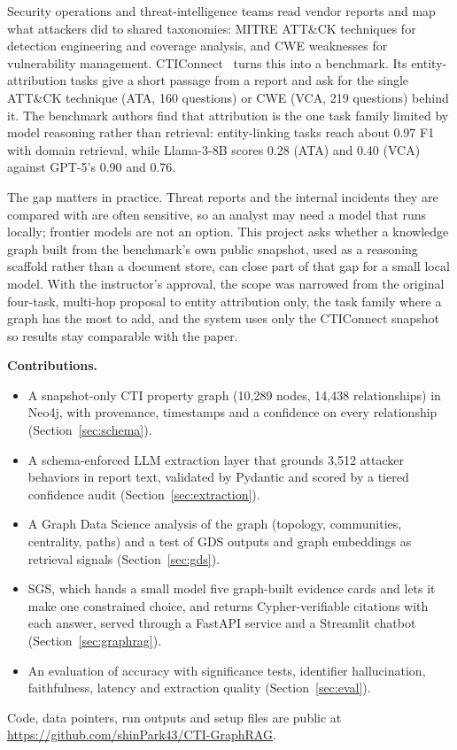 \documentclass[conference]{IEEEtran}
\begin{document}
Security operations and threat-intelligence teams read vendor reports and map what attackers did to shared taxonomies: MITRE ATT\&CK techniques for detection engineering and coverage analysis, and CWE weaknesses for vulnerability management. CTIConnect~\cite{cticonnect} turns this into a benchmark. Its entity-attribution tasks give a short passage from a report and ask for the single ATT\&CK technique (ATA, 160 questions) or CWE (VCA, 219 questions) behind it. The benchmark authors find that attribution is the one task family limited by model reasoning rather than retrieval: entity-linking tasks reach about 0.97 F1 with domain retrieval, while Llama-3-8B scores 0.28 (ATA) and 0.40 (VCA) against GPT-5's 0.90 and 0.76.

The gap matters in practice. Threat reports and the internal incidents they are compared with are often sensitive, so an analyst may need a model that runs locally; frontier models are not an option. This project asks whether a knowledge graph built from the benchmark's own public snapshot, used as a reasoning scaffold rather than a document store, can close part of that gap for a small local model. With the instructor's approval, the scope was narrowed from the original four-task, multi-hop proposal to entity attribution only, the task family where a graph has the most to add, and the system uses only the CTIConnect snapshot so results stay comparable with the paper.

\textbf{Contributions.}
\begin{itemize}
\item A snapshot-only CTI property graph (10,289 nodes, 14,438 relationships) in Neo4j, with provenance, timestamps and a confidence on every relationship (Section~\ref{sec:schema}).
\item A schema-enforced LLM extraction layer that grounds 3,512 attacker behaviors in report text, validated by Pydantic and scored by a tiered confidence audit (Section~\ref{sec:extraction}).
\item A Graph Data Science analysis of the graph (topology, communities, centrality, paths) and a test of GDS outputs and graph embeddings as retrieval signals (Section~\ref{sec:gds}).
\item SGS, which hands a small model five graph-built evidence cards and lets it make one constrained choice, and returns Cypher-verifiable citations with each answer, served through a FastAPI service and a Streamlit chatbot (Section~\ref{sec:graphrag}).
\item An evaluation of accuracy with significance tests, identifier hallucination, faithfulness, latency and extraction quality (Section~\ref{sec:eval}).
\end{itemize}
Code, data pointers, run outputs and setup files are public at \url{https://github.com/shinPark43/CTI-GraphRAG}.
\end{document}
